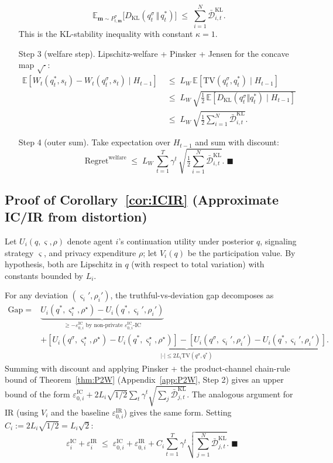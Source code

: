\documentclass{article}
\begin{document}
\begin{enumerate}
$$\mathbb{E}_{\mathbf m \sim P_{t,\mathbf m}^\sigma}\big[D_{\mathrm{KL}}(q_t^\sigma \,\Vert\, q_t^*)\big] \;\le\; \sum_{i=1}^N \bar{\mathcal{D}}_{i,t}^{\mathrm{KL}}. \tag{A.9.2}$$
This is the KL-stability inequality with constant $\kappa = 1$.
    \item[Step 3] (welfare step). Lipschitz-welfare + Pinsker + Jensen for the concave map $\sqrt{\cdot}$:
\begin{align*}
\mathbb{E}[W_t(q_t^*, s_t) - W_t(q_t^\sigma, s_t) \mid H_{t-1}] \;&\le\; L_W\,\mathbb{E}[\mathrm{TV}(q_t^\sigma, q_t^*) \mid H_{t-1}] \\
&\le\; L_W\,\sqrt{\tfrac{1}{2}\,\mathbb{E}[D_{\mathrm{KL}}(q_t^\sigma \Vert q_t^*) \mid H_{t-1}]} \\
&\le\; L_W\,\sqrt{\tfrac{1}{2}\textstyle\sum_{i=1}^N \bar{\mathcal{D}}_{i,t}^{\mathrm{KL}}}.
\end{align*}
    \item[Step 4] (outer sum). Take expectation over $H_{t-1}$ and sum with discount:
$$\mathrm{Regret}^{\mathrm{welfare}} \;\le\; L_W\,\sum_{t=1}^T \gamma^t\,\sqrt{\tfrac{1}{2}\textstyle\sum_{i=1}^N \bar{\mathcal{D}}_{i,t}^{\mathrm{KL}}}. \;\blacksquare$$
\end{enumerate}

\subsection{Proof of Corollary~\ref{cor:ICIR} (Approximate IC/IR from distortion)}\label{app:ICIR}

Let $U_i(q, \varsigma, \rho)$ denote agent $i$'s continuation utility under posterior $q$, signaling strategy $\varsigma$, and privacy expenditure $\rho$; let $V_i(q)$ be the participation value. By hypothesis, both are Lipschitz in $q$ (with respect to total variation) with constants bounded by $L_i$.

For any deviation $(\varsigma_i', \rho_i')$, the truthful-vs-deviation gap decomposes as
\begin{align*}
\text{Gap} \;=\;& \underbrace{U_i(q^*, \varsigma_i^\star, \rho^\star) - U_i(q^*, \varsigma_i', \rho_i')}_{\ge -\varepsilon_{0,i}^{\mathrm{IC}} \text{ by non-private } \varepsilon_{0,i}^{\mathrm{IC}}\text{-IC}} \\
&+ \underbrace{[U_i(q^\sigma, \varsigma_i^\star, \rho^\star) - U_i(q^*, \varsigma_i^\star, \rho^\star)] - [U_i(q^\sigma, \varsigma_i', \rho_i') - U_i(q^*, \varsigma_i', \rho_i')]}_{|{\cdot}| \le 2 L_i \mathrm{TV}(q^\sigma, q^*)}.
\end{align*}
Summing with discount and applying Pinsker + the product-channel chain-rule bound of Theorem~\ref{thm:P2W} (Appendix~\ref{app:P2W}, Step 2) gives an upper bound of the form $\varepsilon_{0,i}^{\mathrm{IC}} + 2 L_i \sqrt{1/2} \sum_t \gamma^t \sqrt{\sum_j \bar{\mathcal{D}}_{j,t}^{\mathrm{KL}}}$. The analogous argument for IR (using $V_i$ and the baseline $\varepsilon_{0,i}^{\mathrm{IR}}$) gives the same form. Setting $C_i := 2 L_i \sqrt{1/2} = L_i \sqrt{2}$:
$$\varepsilon_i^{\mathrm{IC}} + \varepsilon_i^{\mathrm{IR}} \;\le\; \varepsilon_{0,i}^{\mathrm{IC}} + \varepsilon_{0,i}^{\mathrm{IR}} + C_i \sum_{t=1}^T \gamma^t \sqrt{\sum_{j=1}^N \bar{\mathcal{D}}_{j,t}^{\mathrm{KL}}}. \;\blacksquare$$
\end{document}
